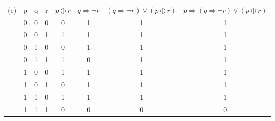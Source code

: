 \documentclass[a4paper, 12pt]{article}  %
\begin{document}
\begin{table}[H]
    \begin{tabular}[H]{c|c|c|c|c|c|c|c|}
        (c) & p & q & r & $p \oplus  r$ & $q \Rightarrow \neg r$ & $(q \Rightarrow \neg r) \lor (p \oplus r)$ & $p \Rightarrow (q \Rightarrow \neg r) \lor (p \oplus r)$\\
            & 0 & 0 & 0 &      0        &            1           &                      1                     &                             1                           \\
            & 0 & 0 & 1 &      1        &            1           &                      1                     &                             1                           \\
            & 0 & 1 & 0 &      0        &            1           &                      1                     &                             1                           \\
            & 0 & 1 & 1 &      1        &            0           &                      1                     &                             1                           \\
            & 1 & 0 & 0 &      1        &            1           &                      1                     &                             1                           \\
            & 1 & 0 & 1 &      0        &            1           &                      1                     &                             1                           \\
            & 1 & 1 & 0 &      1        &            1           &                      1                     &                             1                           \\
            & 1 & 1 & 1 &      0        &            0           &                      0                     &                             0                           \\

    \end{tabular}
\end{table}
\end{document}
